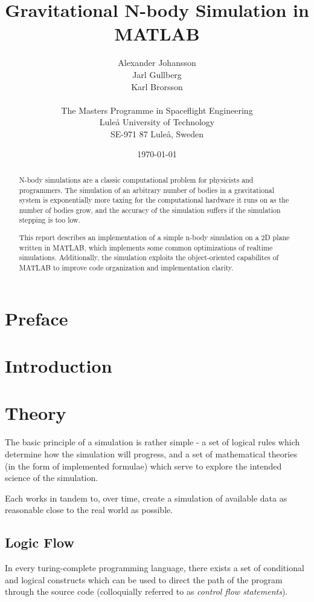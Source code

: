 \documentclass[11pt]{article}
\title{\textbf{Gravitational N-body Simulation in MATLAB}}
\author{Alexander Johansson\\
		Jarl Gullberg\\
		Karl Brorsson\\
		\\
		The Masters Programme in Spaceflight Engineering\\
		Luleå University of Technology\\SE-971 87 Luleå, Sweden}
\date{\today}
\begin{document}
\maketitle

\begin{abstract}
N-body simulations are a classic computational problem for physicists and programmers. The simulation of 
an arbitrary number of bodies in a gravitational system is exponentially more taxing for the computational 
hardware it runs on as the number of bodies grow, and the accuracy of the simulation suffers if the simulation
stepping is too low.

This report describes an implementation of a simple n-body simulation on a 2D plane written in MATLAB, which 
implements some common optimizations of realtime simulations. Additionally, the simulation exploits the 
object-oriented capabilites of MATLAB to improve code organization and implementation clarity.
\end{abstract}

\pagebreak
\tableofcontents

\pagebreak
\section{Preface}

\section{Introduction}

\section{Theory}
The basic principle of a simulation is rather simple - a set of logical rules which determine how the 
simulation will progress, and a set of mathematical theories (in the form of implemented formulae) which
serve to explore the intended science of the simulation.

Each works in tandem to, over time, create a simulation of available data as reasonable close to the real 
world as possible.
\subsection{Logic Flow}
In every turing-complete programming language, there exists a set of conditional and logical constructs
which can be used to direct the path of the program through the source code (colloquially referred to as \emph{control flow statements}). 
\end{document}
